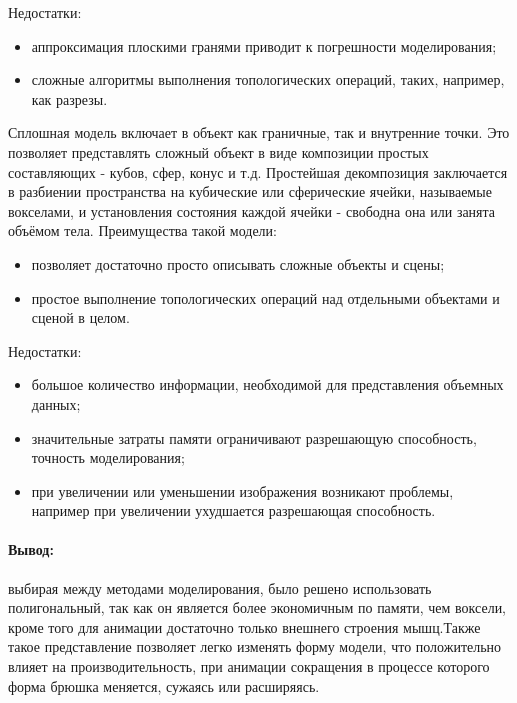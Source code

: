 Недостатки:
\begin{itemize}
	\item аппроксимация плоскими гранями приводит к погрешности моделирования;
	\item сложные алгоритмы выполнения топологических операций, таких, например, как разрезы.
\end{itemize}
\par Сплошная модель включает в объект как граничные, так и внутренние точки. Это позволяет представлять сложный объект в виде композиции простых составляющих - кубов, сфер, конус и т.д. Простейшая декомпозиция заключается в разбиении пространства на кубические или сферические ячейки, называемые вокселами, и установления состояния каждой ячейки - свободна она или занята объёмом тела. Преимущества такой модели:
\begin{itemize}
	\item позволяет достаточно просто описывать сложные объекты и сцены;
	\item простое выполнение топологических операций над отдельными объектами и сценой в целом.
\end{itemize}
Недостатки:
\begin{itemize}
	\item большое количество информации, необходимой для представления объемных данных;
	\item значительные затраты памяти ограничивают разрешающую способность, точность моделирования;
	\item при увеличении или уменьшении изображения возникают проблемы, например при увеличении ухудшается разрешающая способность.
\end{itemize}
\paragraph{Вывод:} выбирая между методами моделирования, было решено использовать полигональный, так как он является более экономичным по памяти, чем воксели, кроме того для анимации достаточно только внешнего строения мышц.Также такое представление позволяет легко изменять форму модели, что положительно влияет на производительность, при анимации сокращения в процессе которого форма брюшка меняется, сужаясь или расширяясь. 

